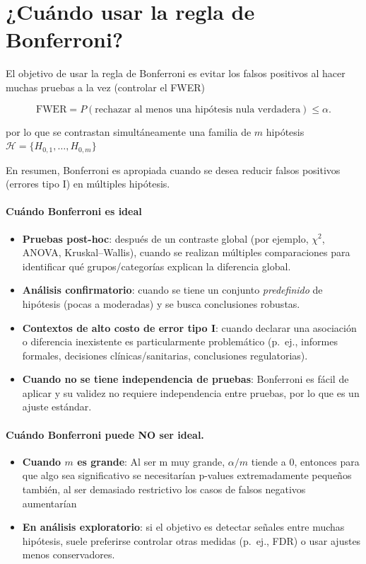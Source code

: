 \section{¿Cuándo usar la regla de Bonferroni?}

El objetivo de usar la regla de Bonferroni es evitar los falsos positivos al hacer muchas pruebas a la vez (controlar el FWER)

\[
\mathrm{FWER}=P\!\left(\text{rechazar al menos una hip\'otesis nula verdadera}\right)\le \alpha.
\]

por lo que se contrastan simult\'aneamente una familia de $m$ hip\'otesis $\mathcal{H}=\{H_{0,1},\dots,H_{0,m}\}$ 


En resumen, Bonferroni es apropiada cuando se desea reducir falsos positivos (errores tipo I) en múltiples hipótesis.

\paragraph{Cuándo Bonferroni es ideal}
\begin{itemize}
    \item \textbf{Pruebas post-hoc}: despu\'es de un contraste global (por ejemplo, $\chi^2$, ANOVA, Kruskal--Wallis), cuando se realizan m\'ultiples comparaciones para identificar qu\'e grupos/categor\'ias explican la diferencia global.
    \item \textbf{An\'alisis confirmatorio}: cuando se tiene un conjunto \emph{predefinido} de hip\'otesis (pocas a moderadas) y se busca conclusiones robustas.
    \item \textbf{Contextos de alto costo de error tipo I}: cuando declarar una asociaci\'on o diferencia inexistente es particularmente problem\'atico (p.\ ej., informes formales, decisiones cl\'inicas/sanitarias, conclusiones regulatorias).
    \item \textbf{Cuando no se tiene independencia de pruebas}: Bonferroni es f\'acil de aplicar y su validez no requiere independencia entre pruebas, por lo que es un ajuste estándar.
\end{itemize}

\paragraph{Cu\'ando Bonferroni puede NO ser ideal.}
\begin{itemize}
    \item \textbf{Cuando $m$ es grande}: Al ser m muy grande, $\alpha/m$ tiende a 0, entonces para que algo sea significativo se necesitarían p-values extremadamente pequeños también, al ser demasiado restrictivo los casos de falsos negativos aumentarían
    
    \item \textbf{En an\'alisis exploratorio}: si el objetivo es detectar se\~nales entre muchas hip\'otesis, suele preferirse controlar otras medidas (p.\ ej., FDR) o usar ajustes menos conservadores.
\end{itemize}

